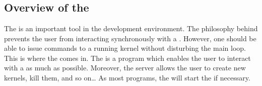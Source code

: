 
\part{\OPRSS{}}



\chapter*{Overview of the \OPRSS{}}

The \OPRSS{} is an important tool in the \COPRS{} development environment.
The philosophy behind \COPRS{} prevents the user from interacting synchronously
with a \CPK{}. However, one should be able to issue commands to a running
kernel without disturbing the \CPK{} main loop. This is where the \OPRSS{}
comes in.  The \OPRSS{} is a program which enables the user to interact
with a \CPK{} as much as possible. Moreover, the server allows the user to
create new kernels, kill them, and so on\dots{} As most \COPRSDE{} programs, the
\OPRSS{} will start the \MPA{} if necessary.

